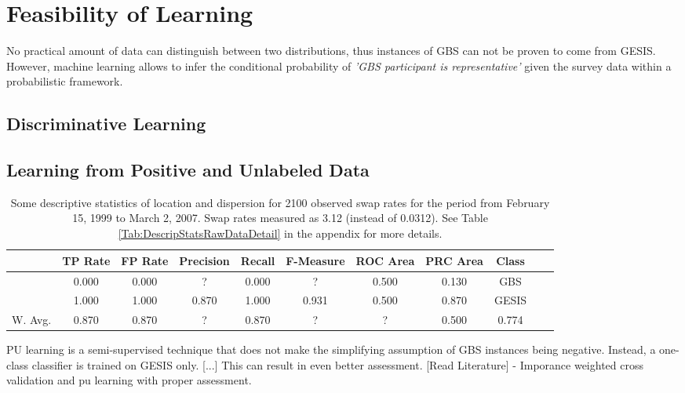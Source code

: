 \chapter{Feasibility of Learning}\label{Sec:Feasibility of Learning}

No practical amount of data can distinguish between two distributions, thus instances of GBS can not be proven to come from GESIS. However, machine learning allows to infer the conditional probability of \textit{'GBS participant is representative'} given the survey data within a probabilistic framework. 



\section{Discriminative Learning}

\section{Learning from Positive and Unlabeled Data}

\begin{table}[ht] 	
    \begin{center}
            {\footnotesize
            \begin{tabular}{l|cccccccccc}
                \hline \hline
                           &  TP Rate & FP Rate & Precision & Recall & F-Measure & ROC Area & PRC Area & Class \\
                \hline
                      & 0.000 & 0.000 & ? & 0.000 & ? & 0.500 & 0.130 & GBS &\\
                      & 1.000 & 1.000 & 0.870 & 1.000 & 0.931 & 0.500 & 0.870 & GESIS &\\
                \hline \hline
		 W. Avg. & 0.870 & 0.870 & ? & 0.870 & ? & ? & 0.500 & 0.774 &
            \end{tabular}}
        \caption{Some descriptive statistics of location and dispersion for 2100 observed swap rates for the period from February 15, 1999 to March 2, 2007. Swap rates measured as 3.12 (instead of 0.0312). See Table \ref{Tab:DescripStatsRawDataDetail} in the appendix for more details.}
\label{Tab:DescripStatsRawData}
\end{center}
\end{table}

PU learning is a semi-supervised technique that does not make the simplifying assumption of GBS instances being negative. Instead, a one-class classifier is trained on GESIS only. [...] This can result in even better assessment. [Read Literature] - Imporance weighted cross validation and pu learning with proper assessment.

